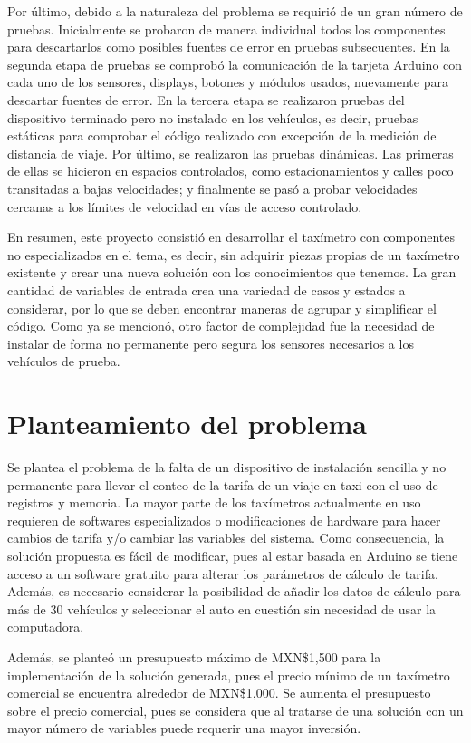 \documentclass[a4paper,11pt]{article}
\begin{document}
Por último, debido a la naturaleza del problema se requirió de un gran número de pruebas. Inicialmente se probaron de manera individual todos los componentes para descartarlos como posibles fuentes de error en pruebas subsecuentes. En la segunda etapa de pruebas se comprobó la comunicación de la tarjeta Arduino con cada uno de los sensores, displays, botones y módulos usados, nuevamente para descartar fuentes de error. En la tercera etapa se realizaron pruebas del dispositivo terminado pero no instalado en los vehículos, 
es decir, pruebas estáticas para comprobar el código realizado con excepción de la medición de distancia de viaje. Por último, se realizaron las pruebas dinámicas. 
Las primeras de ellas se hicieron en espacios controlados, como estacionamientos y calles poco transitadas a bajas velocidades; y finalmente se pasó a probar velocidades cercanas a los límites de velocidad en vías de acceso controlado.

En resumen, este proyecto consistió en desarrollar el taxímetro con componentes no especializados en el tema, es decir, sin adquirir piezas propias de un taxímetro existente y crear una nueva solución con los conocimientos que tenemos. La gran cantidad de variables de entrada crea una variedad de casos y estados a considerar, por lo que se deben encontrar maneras de agrupar y simplificar el código. Como ya se mencionó, otro factor de complejidad fue la necesidad de instalar de forma no permanente pero segura los sensores necesarios a los vehículos de prueba.


\section*{Planteamiento del problema}
Se plantea el problema de la falta de un dispositivo de instalación sencilla y no permanente para llevar el conteo de la tarifa de un viaje en taxi con el uso de registros y memoria. La mayor parte de los taxímetros actualmente en uso requieren de softwares especializados o modificaciones de hardware para hacer cambios de tarifa y/o cambiar las variables del sistema. Como consecuencia, la solución propuesta es fácil de modificar, pues al estar basada en Arduino se tiene acceso a un software gratuito para alterar los parámetros de cálculo de tarifa. Además, es necesario considerar la posibilidad de añadir los datos de cálculo para más de 30 vehículos y seleccionar el auto en cuestión sin necesidad de usar la computadora. 

Además, se planteó un presupuesto máximo de MXN\$1,500 
para la implementación de la solución generada, 
pues el precio mínimo de un taxímetro comercial se encuentra alrededor de
 MXN\$1,000. Se aumenta el presupuesto sobre el precio comercial, 
 pues se considera que al tratarse de una solución con un mayor número de variables puede requerir una mayor inversión.
\end{document}
